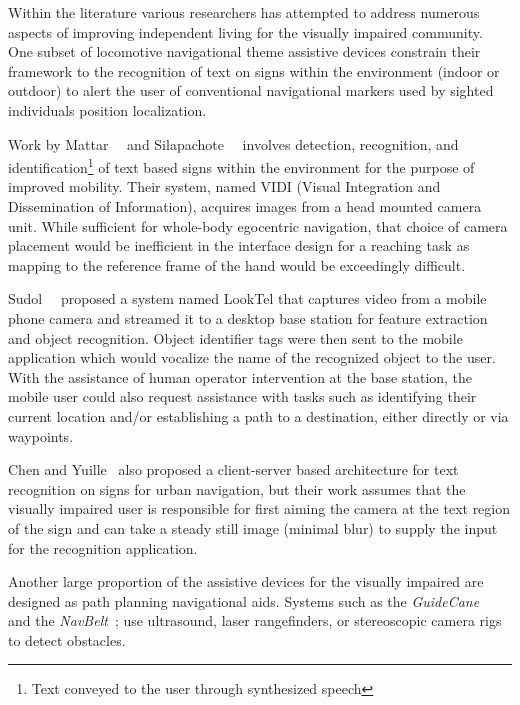 Within the literature various researchers has attempted to address numerous aspects of improving independent living for the visually impaired community.  One subset of locomotive navigational theme assistive devices constrain their framework to the recognition of text on signs within the environment (indoor or outdoor) to alert the user of conventional navigational markers used by sighted individuals position localization.

Work by Mattar~\etal~\cite{MATTAR05} and Silapachote~\etal~\cite{SILAPACHOTE05} involves detection, recognition, and identification\footnote{Text conveyed to the user through synthesized speech} of text based signs within the environment for the purpose of improved mobility.  Their system, named VIDI (Visual Integration and Dissemination of Information), acquires images from a head mounted camera unit. While sufficient for whole-body egocentric navigation, that choice of camera placement would be inefficient in the interface design for a reaching task as mapping to the reference frame of the hand would be exceedingly difficult.

Sudol~\etal~\cite{SUDOL10} proposed a system named LookTel that captures video from a mobile phone camera and streamed it to a desktop base station for feature extraction and object recognition.  Object identifier tags were then sent to the mobile application which would vocalize the name of the recognized object to the user.  With the assistance of human operator intervention at the base station, the mobile user could also request assistance with tasks such as identifying their current location and/or establishing a path to a destination, either directly or via waypoints.

Chen and Yuille~\cite{CHEN04} also proposed a client-server based architecture for text recognition on signs for urban navigation, but their work assumes that the visually impaired user is responsible for first aiming the camera at the text region of the sign and can take a steady still image (minimal blur) to supply the input for the recognition application.

Another large proportion of the assistive devices for the visually impaired are designed as path planning navigational aids. Systems such as the \textit{GuideCane}~\cite{Bib:Ulrich} and the \textit{NavBelt}~\cite{Bib:Shoval}; use ultrasound, laser rangefinders, or stereoscopic camera rigs~\cite{Bib:Audette} to detect
obstacles.

